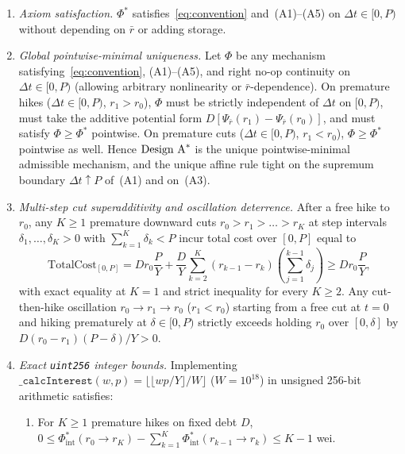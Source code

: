 \begin{theorem}\label{thm:astar}
\begin{enumerate}[label=(\roman*), leftmargin=2.2em, itemsep=2pt]
\item \emph{Axiom satisfaction.} $\Phi^*$ satisfies~\eqref{eq:convention} and~(A1)--(A5) on $\Delta t \in [0, P)$ without depending on $\bar{r}$ or adding storage.
\item \emph{Global pointwise-minimal uniqueness.} Let $\Phi$ be any mechanism satisfying~\eqref{eq:convention}, (A1)--(A5), and right no-op continuity on $\Delta t \in [0, P)$ (allowing arbitrary nonlinearity or $\bar{r}$-dependence). On premature hikes ($\Delta t \in [0, P)$, $r_1 > r_0$), $\Phi$ must be strictly independent of $\Delta t$ on $[0, P)$, must take the additive potential form $D[\Psi_{\bar{r}}(r_1) - \Psi_{\bar{r}}(r_0)]$, and must satisfy $\Phi \ge \Phi^*$ pointwise. On premature cuts ($\Delta t \in [0, P)$, $r_1 < r_0$), $\Phi \ge \Phi^*$ pointwise as well. Hence $\textup{Design A}^*$ is the unique pointwise-minimal admissible mechanism, and the unique affine rule tight on the supremum boundary $\Delta t \uparrow P$ of~(A1) and on~(A3).
\item \emph{Multi-step cut superadditivity and oscillation deterrence.} After a free hike to $r_0$, any $K \ge 1$ premature downward cuts $r_0 > r_1 > \dots > r_K$ at step intervals $\delta_1, \dots, \delta_K > 0$ with $\sum_{k=1}^K \delta_k < P$ incur total cost over $[0, P]$ equal to
\begin{equation}\label{eq:multicut}
\mathrm{TotalCost}_{[0, P]} = D r_0 \frac{P}{Y} + \frac{D}{Y}\sum_{k=2}^K (r_{k-1} - r_k)\!\left(\sum_{j=1}^{k-1}\delta_j\right) \ge D r_0 \frac{P}{Y},
\end{equation}
with exact equality at $K = 1$ and strict inequality for every $K \ge 2$. Any cut-then-hike oscillation $r_0 \to r_1 \to r_0$ ($r_1 < r_0$) starting from a free cut at $t = 0$ and hiking prematurely at $\delta \in [0, P)$ strictly exceeds holding $r_0$ over $[0, \delta]$ by $D(r_0 - r_1)(P - \delta)/Y > 0$.
\item \emph{Exact \texttt{uint256} integer bounds.} Implementing $\texttt{\_calcInterest}(w, p) = \lfloor \lfloor w p / Y \rfloor / W \rfloor$ ($W = 10^{18}$) in unsigned 256-bit arithmetic satisfies:
\begin{enumerate}[label=(\alph*), leftmargin=1.8em, itemsep=1pt]
\item For $K \ge 1$ premature hikes on fixed debt $D$, $0 \le \Phi^*_{\mathrm{int}}(r_0 \to r_K) - \sum_{k=1}^K \Phi^*_{\mathrm{int}}(r_{k-1} \to r_k) \le K - 1$ wei.

\end{enumerate}
\end{enumerate}
\end{theorem}
